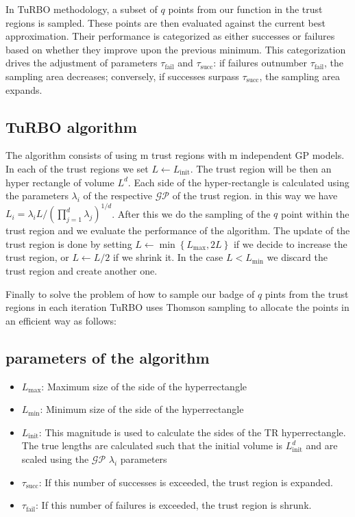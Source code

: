 \documentclass{article}
\begin{document}
In TuRBO methodology, a subset of $q$ points from our function in the trust regions is sampled. These points are then evaluated against the current best approximation. Their performance is categorized as either successes or failures based on whether they improve upon the previous minimum. This categorization drives the adjustment of parameters $\tau_{\text{fail}}$ and $\tau_{\text{succ}}$: if failures outnumber $\tau_{\text{fail}}$, the sampling area decreases; conversely, if successes surpass $\tau_{\text{succ}}$, the sampling area expands. 

\subsection{TuRBO algorithm}

The algorithm consists of using m trust regions with m independent GP models. In each of the trust regions we set $L \longleftarrow L_{\text{init}}$. The trust region will be then an hyper rectangle of volume $L^d$. Each side of the hyper-rectangle is calculated using the parameters $\lambda_i$ of the respective $\mathcal{GP}$ of the trust region. in this way we have $L_i=\lambda_i L /\left(\prod_{j=1}^d \lambda_j\right)^{1 / d}$. After this we do the sampling of the $q$ point within the trust region and we evaluate the performance of the algorithm. The update of the trust region is done by setting $L \leftarrow \min \left\{L_{\max }, 2 L\right\}$ if we decide to increase the trust region, or $L \leftarrow  L/2$ if we shrink it. In the case $L < L_{\min}$ we discard the trust region and create another one. 

Finally to solve the problem of how to sample our badge of $q$ pints from the trust regions in each iteration TuRBO uses Thomson sampling to allocate the points in an efficient way as follows:




\subsection{parameters of the algorithm}
\begin{itemize}
    \item $L_{\text{max}}$: Maximum size of the side of the hyperrectangle
    \item $L_{\text{min}}$: Minimum size of the side of the hyperrectangle
    \item $L_{\text{init}}$: This magnitude is used to calculate the sides of the TR hyperrectangle. The true lengths are calculated such that the initial volume is $L_{\text{init}}^d$ and are scaled using the $\mathcal{GP}$ $\lambda_i$ parameters
    \item $\tau_{\text{succ}}$: If this number of successes is exceeded, the trust region is expanded.
    \item $\tau_{\text{fail}}$: If this number of failures is exceeded, the trust region is shrunk.
\end{itemize}
\end{document}

